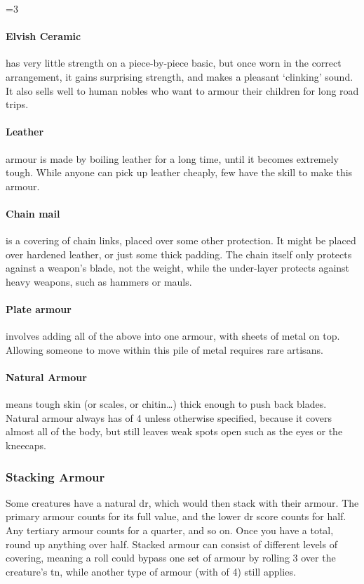 \begin{multicols}{2}
\ifnum\value{r4}=3
  \paragraph{Elvish Ceramic}
  has very little strength on a piece-by-piece basic, but once worn in the correct arrangement, it gains surprising strength, and makes a pleasant `clinking' sound.
  It also sells well to human nobles who want to armour their children for long road trips. 
\fi

\paragraph{Leather}
armour is made by boiling leather for a long time, until it becomes extremely tough.
While anyone can pick up leather cheaply, few have the skill to make this armour.

\paragraph{Chain mail}
is a covering of chain links, placed over some other protection.
It might be placed over hardened leather, or just some thick padding.
The chain itself only protects against a weapon's blade, not the weight, while the under-layer protects against heavy weapons, such as hammers or mauls.

\paragraph{Plate armour}
involves adding all of the above into one armour, with sheets of metal on top.
Allowing someone to move within this pile of metal requires rare artisans.


\paragraph{Natural Armour}
means tough skin (or scales, or chitin\ldots) thick enough to push back blades.
Natural armour always has  of 4 unless otherwise specified, because it covers almost all of the body, but still leaves weak spots open such as the eyes or the kneecaps.

\subsubsection{Stacking Armour}
\label{stackingarmour}

Some creatures have a natural \gls{dr}, which would then stack with their armour.
The primary armour counts for its full value, and the lower \gls{dr} score counts for half.
Any tertiary armour counts for a quarter, and so on.
Once you have a total, round up anything over half.
Stacked armour can consist of different levels of \gls{covering}, meaning a roll could bypass one set of armour by rolling 3 over the creature's \gls{tn}, while another type of armour (with  of 4) still applies.


\end{multicols}
